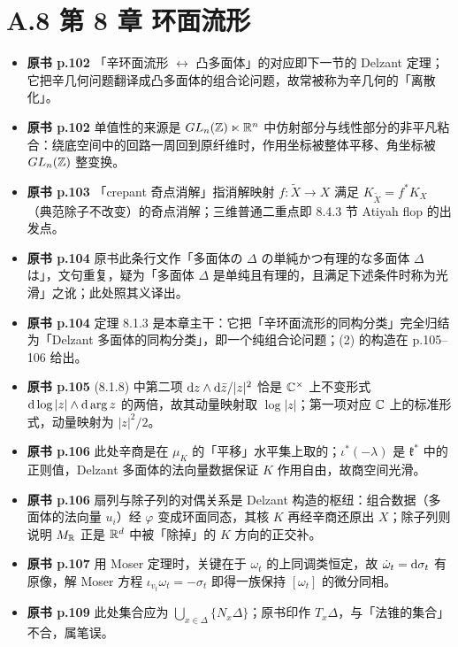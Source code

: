 \section*{A.8 第 8 章 环面流形}
\begin{itemize}[leftmargin=2.4em,itemsep=4pt,label={\textbullet}]
\item \textbf{原书 p.102} 「辛环面流形 $\leftrightarrow$ 凸多面体」的对应即下一节的 Delzant 定理；它把辛几何问题翻译成凸多面体的组合论问题，故常被称为辛几何的「离散化」。
\item \textbf{原书 p.102} 单值性的来源是 $GL_n(\mathbb{Z})\ltimes\mathbb{R}^n$ 中仿射部分与线性部分的非平凡粘合：绕底空间中的回路一周回到原纤维时，作用坐标被整体平移、角坐标被 $GL_n(\mathbb{Z})$ 整变换。
\item \textbf{原书 p.103} 「crepant 奇点消解」指消解映射 $f\colon\tilde X\to X$ 满足 $K_{\tilde X}=f^*K_X$（典范除子不改变）的奇点消解；三维普通二重点即 8.4.3 节 Atiyah flop 的出发点。
\item \textbf{原书 p.104} 原书此条行文作「多面体の $\Delta$ の単純かつ有理的な多面体 $\Delta$ は」，文句重复，疑为「多面体 $\Delta$ 是单纯且有理的，且满足下述条件时称为光滑」之讹；此处照其义译出。
\item \textbf{原书 p.104} 定理 8.1.3 是本章主干：它把「辛环面流形的同构分类」完全归结为「Delzant 多面体的同构分类」，即一个纯组合论问题；(2) 的构造在 p.105--106 给出。
\item \textbf{原书 p.105} (8.1.8) 中第二项 $\mathrm{d} z\wedge\mathrm{d}\bar z/|z|^2$ 恰是 $\mathbb{C}^\times$ 上不变形式 $\mathrm{d}\log|z|\wedge\mathrm{d}\arg z$ 的两倍，故其动量映射取 $\log|z|$；第一项对应 $\mathbb{C}$ 上的标准形式，动量映射为 $|z|^2/2$。
\item \textbf{原书 p.106} 此处辛商是在 $\mu_K$ 的「平移」水平集上取的；$\iota^*(-\lambda)$ 是 $\mathfrak{k}^*$ 中的正则值，Delzant 多面体的法向量数据保证 $K$ 作用自由，故商空间光滑。
\item \textbf{原书 p.106} 扇列与除子列的对偶关系是 Delzant 构造的枢纽：组合数据（多面体的法向量 $u_i$）经 $\varphi$ 变成环面同态，其核 $K$ 再经辛商还原出 $X$；除子列则说明 $M_{\mathbb{R}}$ 正是 $\mathbb{R}^d$ 中被「除掉」的 $K$ 方向的正交补。
\item \textbf{原书 p.107} 用 Moser 定理时，关键在于 $\omega_t$ 的上同调类恒定，故 $\dot\omega_t=\mathrm{d}\sigma_t$ 有原像，解 Moser 方程 $\iota_{v_t}\omega_t=-\sigma_t$ 即得一族保持 $[\omega_t]$ 的微分同相。
\item \textbf{原书 p.109} 此处集合应为 $\bigcup_{x\in\Delta}\{N_x\Delta\}$；原书印作 $T_x\Delta$，与「法锥的集合」不合，属笔误。

\end{itemize}
